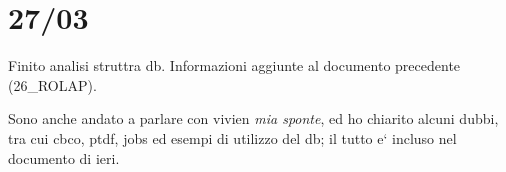 \section{27/03}
    Finito analisi struttra db. Informazioni aggiunte al documento precedente (26\_ROLAP).
    
    Sono anche andato a parlare con vivien \textit{mia sponte}, ed ho chiarito alcuni dubbi, tra cui cbco, ptdf, jobs ed esempi di utilizzo del db; il tutto e` incluso nel documento di ieri.
    